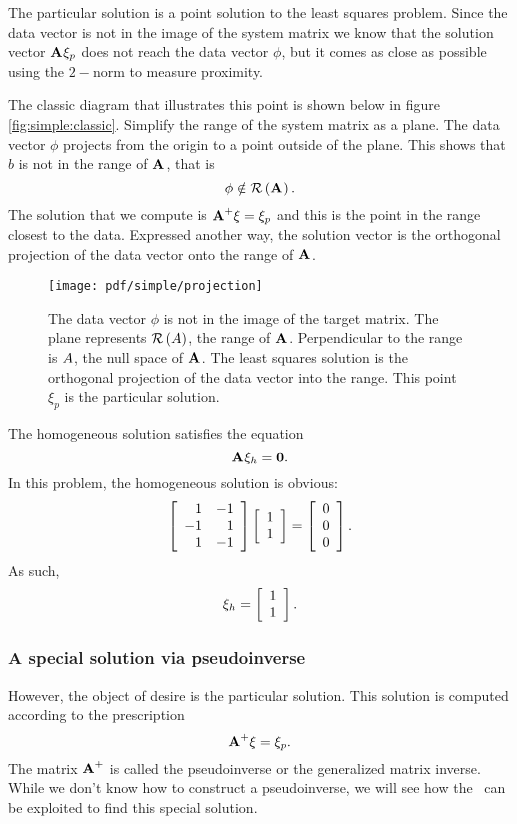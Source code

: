 The particular solution is a point solution to the least squares problem. Since the data vector is not in the image of the system matrix we know that the solution vector $\A{}\xi_{p}$ does not reach the data vector $\phi$, but it comes as close as possible using the $2-$norm to measure proximity.

The classic diagram that illustrates this point is shown below in figure \eqref{fig:simple:classic}. Simplify the range of the system matrix as a plane. The data vector $\phi$ projects from the origin to a point outside of the plane. This shows that $b$ is not in the range of $\A{}$, that is
$$
\phi\notin \rng{\A{}}.
$$
The solution that we compute is $\A{+}\xi=\xi_{p}$ and this is the point in the range closest to the data. Expressed another way, the solution vector is the orthogonal projection of the data vector onto the range of $\A{}$.
\begin{figure}[htbp] %
   \centering
   \texttt{[image: pdf/simple/projection]} 
   \caption{The data vector $\phi$ is not in the image of the target matrix. The plane represents $\rng{A}$, the range of $\A{}$. Perpendicular to the range is $\null{A}$, the null space of $\A{}$. The least squares solution is the orthogonal projection of the data vector into the range. This point $\xi_{p}$ is the particular solution.}
   \label{fig:simple:classic}
\end{figure}

The homogeneous solution satisfies the equation
\begin{equation}
  \A{}\xi_{h} = \zero.
\end{equation}
In this problem, the homogeneous solution is obvious:
\begin{equation}
  \Aexample \mat{r}{1\\1} = \mat{c}{0\\0\\0}.
\end{equation}
As such,
\begin{equation}
  \xi_{h} = \mat{r}{1\\1}.
  \label{eq:2:xih}
\end{equation}

\subsubsection{A special solution via pseudoinverse}
However, the object of desire is the particular solution. This solution is computed according to the prescription
\begin{equation}
  \A{+}\xi = \xi_{p}.
\end{equation}
The matrix $\A{+}$ is called the pseudoinverse or the generalized matrix inverse. While we don't know how to construct a pseudoinverse, we will see how the \svdl \ can be exploited to find this special solution.

\endinput